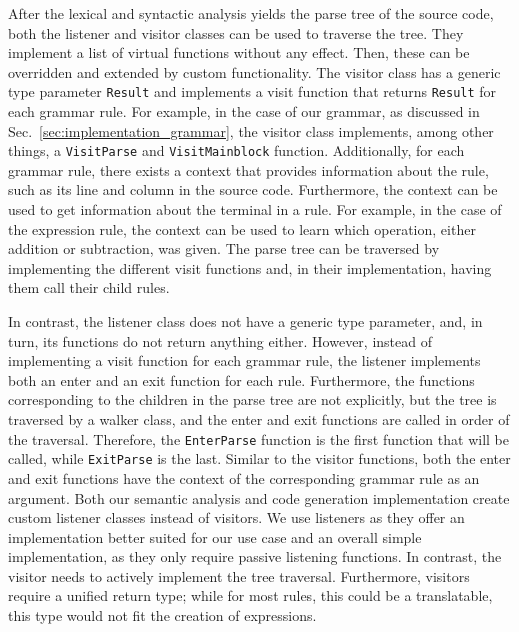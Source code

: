 After the lexical and syntactic analysis yields the parse tree of the source code, both the listener and visitor classes can be used to traverse the tree. They implement a list of virtual functions without any effect. Then, these can be overridden and extended by custom functionality. The visitor class has a generic type parameter \texttt{Result} and implements a visit function that returns \texttt{Result} for each grammar rule. For example, in the case of our grammar, as discussed in Sec.~\ref{sec:implementation_grammar}, the visitor class implements, among other things, a \texttt{VisitParse} and \texttt{VisitMainblock} function.
Additionally, for each grammar rule, there exists a context that provides information about the rule, such as its line and column in the source code. Furthermore, the context can be used to get information about the terminal in a rule. For example, in the case of the expression rule, the context can be used to learn which operation, either addition or subtraction, was given. The parse tree can be traversed by implementing the different visit functions and, in their implementation, having them call their child rules.

In contrast, the listener class does not have a generic type parameter, and, in turn, its functions do not return anything either. However, instead of implementing a visit function for each grammar rule, the listener implements both an enter and an exit function for each rule. Furthermore, the functions corresponding to the children in the parse tree are not explicitly, but the tree is traversed by a walker class, and the enter and exit functions are called in order of the traversal. Therefore, the \texttt{EnterParse} function is the first function that will be called, while \texttt{ExitParse} is the last. Similar to the visitor functions, both the enter and exit functions have the context of the corresponding grammar rule as an argument. Both our semantic analysis and code generation implementation create custom listener classes instead of visitors. We use listeners as they offer an implementation better suited for our use case and an overall simple implementation, as they only require passive listening functions. In contrast, the visitor needs to actively implement the tree traversal. Furthermore, visitors require a unified return type; while for most rules, this could be a translatable, this type would not fit the creation of expressions.